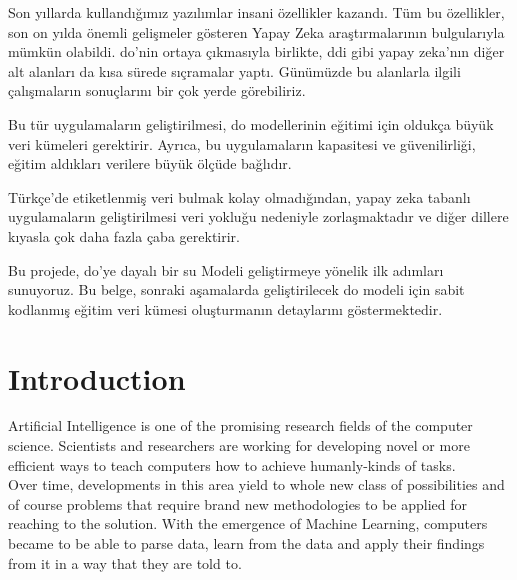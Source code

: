 \documentclass{mefsdp}
\begin{document}
		
	\begin{abstractTR}
	Son yıllarda kullandığımız yazılımlar insani özellikler kazandı. Tüm bu özellikler, son on yılda önemli gelişmeler gösteren Yapay Zeka araştırmalarının bulgularıyla mümkün olabildi. \gls{do}'nin ortaya çıkmasıyla birlikte, \gls{ddi} gibi yapay zeka'nın  diğer alt alanları da kısa sürede sıçramalar yaptı. Günümüzde bu alanlarla ilgili çalışmaların sonuçlarını bir çok yerde görebiliriz. \newline \par
	
	Bu tür uygulamaların geliştirilmesi, \gls{do} modellerinin eğitimi için oldukça büyük veri kümeleri gerektirir. Ayrıca, bu uygulamaların kapasitesi ve güvenilirliği, eğitim aldıkları verilere büyük ölçüde bağlıdır. \newline \par
	
	Türkçe'de etiketlenmiş veri bulmak kolay olmadığından, yapay zeka tabanlı uygulamaların geliştirilmesi veri yokluğu nedeniyle zorlaşmaktadır ve diğer dillere kıyasla çok daha fazla çaba gerektirir. \newline \par
	
	Bu projede, \gls{do}'ye dayalı bir \gls{su} Modeli geliştirmeye yönelik ilk adımları sunuyoruz. Bu belge, sonraki aşamalarda geliştirilecek \gls{do} modeli için sabit kodlanmış eğitim veri kümesi oluşturmanın detaylarını göstermektedir. 
		
	\end{abstractTR}
	
	\makelists

	\section{Introduction}
	Artificial Intelligence is one of the promising research fields of the computer science. Scientists and researchers are working for developing novel or more efficient ways to teach computers how to achieve humanly-kinds of tasks.\\
	
	Over time, developments in this area yield to whole new class of possibilities and of course problems that require brand new methodologies to be applied for reaching to the solution. With the emergence of Machine Learning, computers became to be able to parse data, learn from the data and apply their findings from it in a way that they are told to.\\
	
\end{document}
